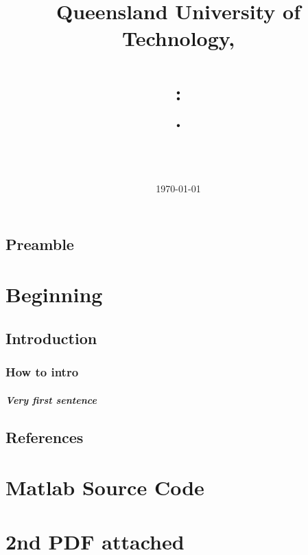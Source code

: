 \documentclass[english]{report}
\title{ Queensland University of Technology, \subjectCode \\ \HRule{1 pt} \\ \AssignmentNum : \\ \taskName.
\HRule{2.0pt} \\ [0.6cm]}
\author{\textbf{\myname} \\ \\ \mySTDNum }
\date{\today} %
\begin{document}
\maketitle
\pagestyle{fancy}
\tableofcontents %
\newpage
\section*{Preamble}

\chapter{Beginning} %

\section{Introduction} %
\subsection{How to intro}
\paragraph{Very first sentence }


\newpage
\section*{References}
\printbibliography[heading=none] %

\appendix
\chapter{Matlab Source Code}

\chapter{2nd PDF attached}
\end{document}

